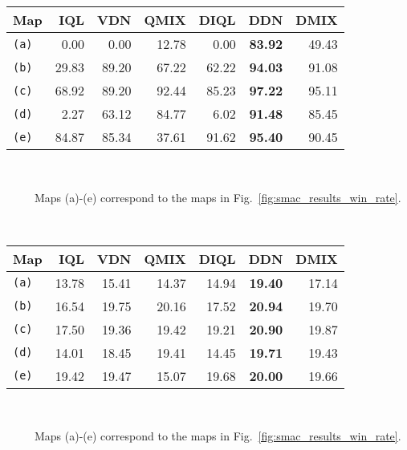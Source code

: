\documentclass{article}
\begin{document}
 \begin{table*}[t]
\begin{minipage}{0.49\textwidth}
\footnotesize
\centering
\caption{The median win rate $\%$ of five independent test runs.}
\begin{tabular}{l|rrr|rrr}
\toprule
Map          & IQL   & VDN   & QMIX  & DIQL  & DDN            & DMIX \\
\midrule
\texttt{(a)} &  0.00 &  0.00 & 12.78 &  0.00 & \textbf{83.92} & 49.43 \\
\texttt{(b)} & 29.83 & 89.20 & 67.22 & 62.22 & \textbf{94.03} & 91.08 \\
\texttt{(c)} & 68.92 & 89.20 & 92.44 & 85.23 & \textbf{97.22} & 95.11 \\
\texttt{(d)} &  2.27 & 63.12 & 84.77 &  6.02 & \textbf{91.48} & 85.45 \\
\texttt{(e)} & 84.87 & 85.34 & 37.61 & 91.62 & \textbf{95.40} & 90.45 \\
\bottomrule
\end{tabular}
\label{table:smac_results_win_rate}
\small\\
\raggedright\ \ \ \ \textasteriskcentered\ Maps (a)-(e) correspond to the maps in Fig.~\ref{fig:smac_results_win_rate}.
\end{minipage}
~
\begin{minipage}{0.49\textwidth}
\small
\centering
\caption{The averaged scores of five independent test runs.}
\begin{tabular}{l|rrr|rrr}
\toprule
Map          & IQL   & VDN   & QMIX  & DIQL  & DDN            & DMIX \\
\midrule
\texttt{(a)} & 13.78 & 15.41 & 14.37 & 14.94 & \textbf{19.40} & 17.14 \\
\texttt{(b)} & 16.54 & 19.75 & 20.16 & 17.52 & \textbf{20.94} & 19.70 \\
\texttt{(c)} & 17.50 & 19.36 & 19.42 & 19.21 & \textbf{20.90} & 19.87 \\
\texttt{(d)} & 14.01 & 18.45 & 19.41 & 14.45 & \textbf{19.71} & 19.43 \\
\texttt{(e)} & 19.42 & 19.47 & 15.07 & 19.68 & \textbf{20.00} & 19.66 \\
\bottomrule
\end{tabular}
\label{table:smac_results_score}
\small\\
\raggedright\ \ \ \ \textasteriskcentered\ Maps (a)-(e) correspond to the maps in Fig.~\ref{fig:smac_results_win_rate}.
\end{minipage}
\end{table*}
 
\end{document}
